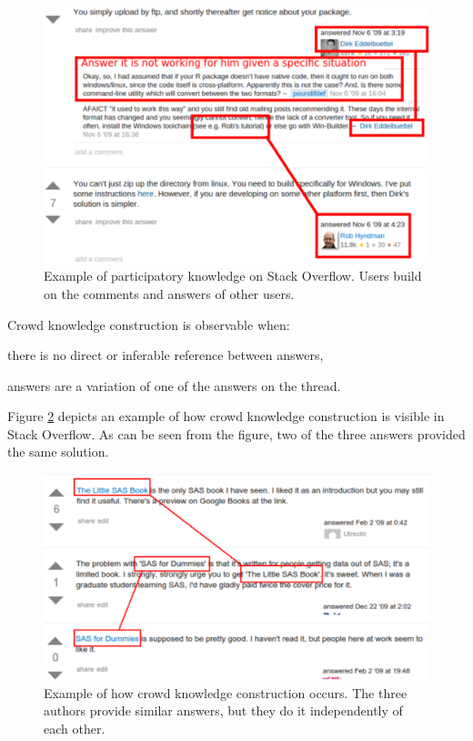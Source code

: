     \begin{figure}[!htb]
        \centering
        \includegraphics[width=\columnwidth]{Figures/SO-PKimg5}
        \caption{Example of participatory knowledge on Stack Overflow. Users build on the comments and answers of other users.}
        \label{fig:SO-PK1}
\vspace{-3mm}
    \end{figure}

    Crowd knowledge construction is observable when:
    \begin{enumerate*}[label=(\arabic*)]
    \item there is no direct or inferable reference between answers,
    \item answers are a variation of one of the answers on the thread.
    \end{enumerate*}
    Figure \ref{fig:CKC_MLSO} depicts an example of how crowd knowledge construction is visible in Stack Overflow.
    As can be seen from the figure, two of the three answers provided the same solution. 

    \begin{figure} [!htb]
        \centering
        \includegraphics[width=\columnwidth]{Figures/SO-CSimg2}
        \caption{Example of how crowd knowledge construction occurs. The three authors provide similar answers, but they do it independently of each other.}
        \label{fig:CKC_MLSO}
\vspace{-3mm}
    \end{figure}

